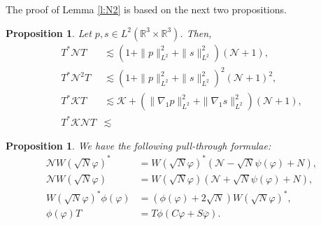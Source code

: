 \documentclass[11pt,a4paper]{scrartcl} %
\newtheorem{prp}[thm]{Proposition}
\newcommand{\R}{\mathds{R}}
\newcommand{\N}{\mathcal{N}}
\newcommand{\K}{\mathcal{K}}
\begin{document}
The proof of Lemma \ref{l:N2} is based on the next two propositions.


\begin{prp}
  \label{p:TNT}
  Let $p, s \in L^2(\R^3 \times \R^3)$. Then,
  \begin{align}
    T^* \N T & \apprle (1 + \| p \|_{L^2}^2 + \| s \|_{L^2}^2) (\N+1),
    \label{TNT} \tag{i} \\
    T^* \N^2 T & \apprle (1 + \| p \|_{L^2}^2 + \| s \|_{L^2}^2)^2 (\N+1)^2,
    \label{TN2T} \tag{ii} \\
    T^* \K T & \apprle \K + (\| \nabla_1 p \|_{L^2}^2 + \| \nabla_1 s
    \|_{L^2}^2) (\N+1), \label{TKT} \tag{iii} \\
    T^* \K \N T & \apprle \label{TKNT} \tag{iv}
  \end{align}
\end{prp}


\begin{prp}
  \label{p:formulae}
  We have the following pull-through formulae:
  \begin{align}
    \N W(\sqrt{N} \varphi)^* & = W(\sqrt{N} \varphi)^* (\N - \sqrt{N}
    \psi(\varphi) + N), \tag{i} \\
    \N W(\sqrt{N} \varphi) & = W(\sqrt{N} \varphi) (\N + \sqrt{N}
    \psi(\varphi) + N), \tag{ii} \\
    W(\sqrt{N} \varphi)^* \phi(\varphi) & = (\phi(\varphi) + 2 \sqrt{N})
    W(\sqrt{N} \varphi)^*, \tag{iii} \\
    \phi(\varphi) T & = T \phi(C \varphi + S \overline{\varphi}). \tag{iv}
  \end{align}
\end{prp}
\end{document}
